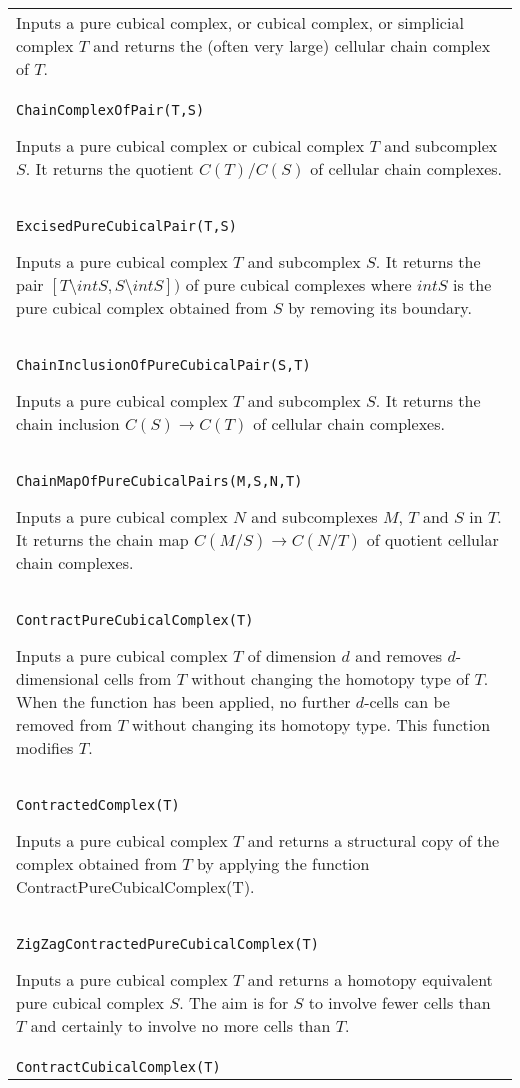 \documentclass[a4paper,11pt]{report}
\begin{document}
{\begin{center}
\begin{tabular}{|l|}
 Inputs a pure cubical complex, or cubical complex, or simplicial complex $T$ and returns the (often very large) cellular chain complex of $T$. \\
 \texttt{ChainComplexOfPair(T,S)} 

 Inputs a pure cubical complex or cubical complex $T$ and subcomplex $S$. It returns the quotient $C(T)/C(S)$ of cellular chain complexes. \\
 \texttt{ExcisedPureCubicalPair(T,S)} 

 Inputs a pure cubical complex $T$ and subcomplex $S$. It returns the pair $[T\setminus intS, S\setminus intS])$ of pure cubical complexes where $intS$ is the pure cubical complex obtained from $S$ by removing its boundary. \\
 \index{ChainInclusionOfPureCubicalPair} \texttt{ChainInclusionOfPureCubicalPair(S,T)} 

 Inputs a pure cubical complex $T$ and subcomplex $S$. It returns the chain inclusion $C(S) \rightarrow C(T)$ of cellular chain complexes. \\
 \index{ChainMapOfPureCubicalPairs} \texttt{ChainMapOfPureCubicalPairs(M,S,N,T)} 

 Inputs a pure cubical complex $N$ and subcomplexes $M$, $T$ and $S$ in $T$. It returns the chain map $C(M/S) \rightarrow C(N/T)$ of quotient cellular chain complexes. \\
 \index{ContractPureCubicalComplex} \texttt{ContractPureCubicalComplex(T)} 

 Inputs a pure cubical complex $T$ of dimension $d$ and removes $d$-dimensional cells from $T$ without changing the homotopy type of $T$. When the function has been applied, no further $d$-cells can be removed from $T$ without changing its homotopy type. This function modifies $T$. \\
 \index{ContractedComplex} \texttt{ContractedComplex(T)} 

 Inputs a pure cubical complex $T$ and returns a structural copy of the complex obtained from $T$ by applying the function ContractPureCubicalComplex(T). \\
 \index{ZigZagContractedPureCubicalComplex} \texttt{ZigZagContractedPureCubicalComplex(T)} 

 Inputs a pure cubical complex $T$ and returns a homotopy equivalent pure cubical complex $S$. The aim is for $S$ to involve fewer cells than $T$ and certainly to involve no more cells than $T$. \\
 \index{ContractCubicalComplex} \texttt{ContractCubicalComplex(T)} 


\end{tabular}
\end{center}}
\end{document}
